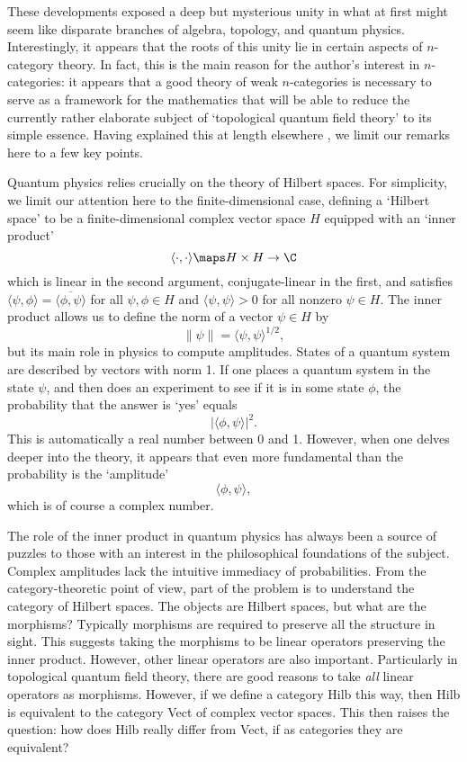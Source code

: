 These developments exposed a deep but mysterious unity in what at first
might seem like disparate branches of algebra, topology, and quantum
physics.  Interestingly, it appears that the roots of this unity lie in
certain aspects of $n$-category theory.  In fact, this is the main
reason for the author's interest in $n$-categories: it appears that a
good theory of weak $n$-categories is necessary to serve as a framework
for the mathematics that will be able to reduce the currently rather
elaborate subject of `topological quantum field theory' to its simple
essence.  Having explained this at length elsewhere \cite{BD}, we limit
our remarks here to a few key points.  

Quantum physics relies crucially on the theory of Hilbert spaces.  For
simplicity, we limit our attention here to the finite-dimensional case,
defining a `Hilbert space' to be a finite-dimensional complex vector
space $H$ equipped with an `inner product'
\[            \langle \cdot, \cdot \rangle \maps H \times H \to \C \]
which is linear in the second argument, conjugate-linear in the first,
and satisfies $\langle \psi, \phi \rangle = \overline {\langle \phi,
\psi \rangle}$ for all $\psi,\phi \in H$ and $\langle \psi,\psi \rangle
> 0$ for all nonzero $\psi \in H$.  The inner product allows us to
define the norm of a vector $\psi \in H$ by
\[       \|\psi \| = \langle \psi , \psi \rangle^{1/2} ,\]
but its main role in physics to compute amplitudes.  States of a quantum
system are described by vectors with norm 1.  If one places a quantum
system in the state $\psi$, and then does an experiment to see if it is
in some state $\phi$, the probability that the answer is `yes' equals
\[              |\langle \phi,\psi \rangle|^2  .\]
This is automatically a real number between 0 and 1.  However, when one
delves deeper into the theory, it appears that even more fundamental
than the probability is the `amplitude'  
\[          \langle \phi, \psi \rangle , \]
which is of course a complex number.  

The role of the inner product in quantum physics has always been a
source of puzzles to those with an interest in the philosophical
foundations of the subject.  Complex amplitudes lack the intuitive
immediacy of probabilities.  From the category-theoretic point of view,
part of the problem is to understand the category of Hilbert spaces.
The objects are Hilbert spaces, but what are the morphisms?  Typically
morphisms are required to preserve all the structure in sight.  This
suggests taking the morphisms to be linear operators preserving the
inner product.  However, other linear operators are also important.
Particularly in topological quantum field theory, there are good reasons
to take {\it all} linear operators as morphisms.  However, if we define
a category Hilb this way, then Hilb is equivalent to the category Vect
of complex vector spaces.  This then raises the question: how does Hilb
really differ from Vect, if as categories they are equivalent?

